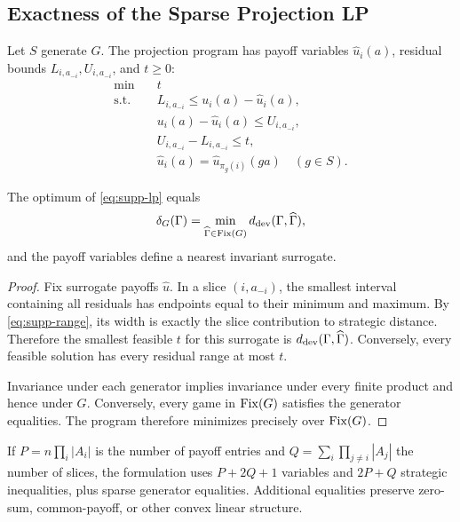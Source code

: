 \subsection{Exactness of the Sparse Projection LP}

Let $S$ generate $G$.  The projection program has payoff variables $\widehat u_i(a)$, residual bounds $L_{i,a_{-i}},U_{i,a_{-i}}$, and $t\ge0$:
\begin{align}
\min\quad&t
\label{eq:supp-lp}\\
\text{s.t.}\quad
&L_{i,a_{-i}}
\le u_i(a)-\widehat u_i(a),\nonumber\\
&u_i(a)-\widehat u_i(a)
\le U_{i,a_{-i}},\nonumber\\
&U_{i,a_{-i}}-L_{i,a_{-i}}\le t,\nonumber\\
&\widehat u_i(a)=\widehat u_{\pi_g(i)}(ga)
\quad(g\in S).\nonumber
\end{align}

\begin{theorem}[Projection LP]
\label{thm:supp-lp}
The optimum of \eqref{eq:supp-lp} equals
\[
\delta_G(\Gamma)
=
\min_{\widehat\Gamma\in\operatorname{Fix}(G)}
d_{\mathrm{dev}}(\Gamma,\widehat\Gamma),
\]
and the payoff variables define a nearest invariant surrogate.
\end{theorem}
\begin{proof}
Fix surrogate payoffs $\widehat u$.  In a slice $(i,a_{-i})$, the smallest interval containing all residuals has endpoints equal to their minimum and maximum.  By \eqref{eq:supp-range}, its width is exactly the slice contribution to strategic distance.  Therefore the smallest feasible $t$ for this surrogate is $d_{\mathrm{dev}}(\Gamma,\widehat\Gamma)$.  Conversely, every feasible solution has every residual range at most $t$.

Invariance under each generator implies invariance under every finite product and hence under $G$.  Conversely, every game in $\operatorname{Fix}(G)$ satisfies the generator equalities.  The program therefore minimizes precisely over $\operatorname{Fix}(G)$.
\end{proof}

If $P=n\prod_i|A_i|$ is the number of payoff entries and
$Q=\sum_i\prod_{j\ne i}|A_j|$ the number of slices, the formulation uses $P+2Q+1$ variables and $2P+Q$ strategic inequalities, plus sparse generator equalities.  Additional equalities preserve zero-sum, common-payoff, or other convex linear structure.
